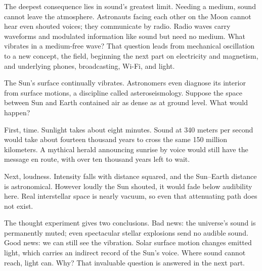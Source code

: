 \begin{mainline}
The deepest consequence lies in sound's greatest limit. Needing a medium, sound cannot leave the atmosphere. Astronauts facing each other on the Moon cannot hear even shouted voices; they communicate by radio. Radio waves carry waveforms and modulated information like sound but need no medium. What vibrates in a medium-free wave? That question leads from mechanical oscillation to a new concept, the field, beginning the next part on electricity and magnetism, and underlying phones, broadcasting, Wi-Fi, and light.
\end{mainline}


\begin{thought}
The Sun's surface continually vibrates. Astronomers even diagnose its interior from surface motions, a discipline called asteroseismology. Suppose the space between Sun and Earth contained air as dense as at ground level. What would happen?

First, time. Sunlight takes about eight minutes. Sound at 340 meters per second would take about fourteen thousand years to cross the same 150 million kilometers. A mythical herald announcing sunrise by voice would still have the message en route, with over ten thousand years left to wait.

Next, loudness. Intensity falls with distance squared, and the Sun--Earth distance is astronomical. However loudly the Sun shouted, it would fade below audibility here. Real interstellar space is nearly vacuum, so even that attenuating path does not exist.

The thought experiment gives two conclusions. Bad news: the universe's sound is permanently muted; even spectacular stellar explosions send no audible sound. Good news: we can still see the vibration. Solar surface motion changes emitted light, which carries an indirect record of the Sun's voice. Where sound cannot reach, light can. Why? That invaluable question is answered in the next part.
\end{thought}

